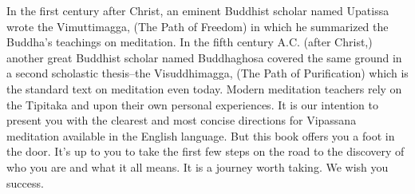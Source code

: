 In the first century after Christ, an eminent Buddhist scholar named Upatissa wrote the Vimuttimagga, (The Path of Freedom) in
which he summarized the Buddha's teachings on meditation. In the fifth century A.C. (after Christ,) another great Buddhist scholar
named Buddhaghosa covered the same ground in a second scholastic thesis--the Visuddhimagga, (The Path of Purification) which
is the standard text on meditation even today. Modern meditation teachers rely on the Tipitaka and upon their own personal
experiences. It is our intention to present you with the clearest and most concise directions for Vipassana meditation available in
the English language. But this book offers you a foot in the door. It's up to you to take the first few steps on the road to the
discovery of who you are and what it all means. It is a journey worth taking. We wish you success.

